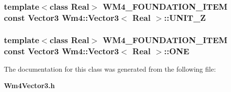 \subsubsection{\setlength{\rightskip}{0pt plus 5cm}template$<$class Real$>$ WM4\_\-FOUNDATION\_\-ITEM const {\bf Vector3} {\bf Wm4::Vector3}$<$ Real $>$::{\bf UNIT\_\-Z}\hspace{0.3cm}{\tt  [static]}}\label{classWm4_1_1Vector3_8fbb0d29c3baae4c939e9383bf3d7873}


\subsubsection{\setlength{\rightskip}{0pt plus 5cm}template$<$class Real$>$ WM4\_\-FOUNDATION\_\-ITEM const {\bf Vector3} {\bf Wm4::Vector3}$<$ Real $>$::{\bf ONE}\hspace{0.3cm}{\tt  [static]}}\label{classWm4_1_1Vector3_405bef51c93e62b6fc50f54ba12ffa72}




The documentation for this class was generated from the following file:\begin{CompactItemize}
\item 
{\bf Wm4Vector3.h}\end{CompactItemize}
